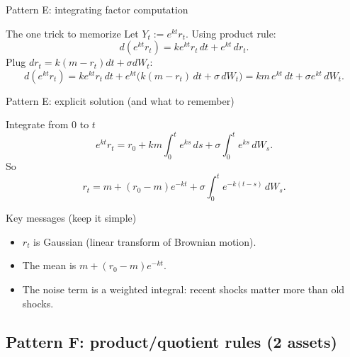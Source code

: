 \documentclass[10pt,aspectratio=169]{beamer}
\begin{document}
\begin{frame}{Pattern E: integrating factor computation}

\begin{block}{The one trick to memorize}
Let $Y_t:=e^{kt}r_t$. Using product rule:\pause
\[
d(e^{kt}r_t)=ke^{kt}r_t\,dt+e^{kt}\,dr_t.
\]
Plug $dr_t=k(m-r_t)dt+\sigma dW_t$:\pause
\[
d(e^{kt}r_t)
=
ke^{kt}r_t\,dt
+
e^{kt}\big(k(m-r_t)\,dt+\sigma\,dW_t\big)
=
km\,e^{kt}\,dt+\sigma e^{kt}\,dW_t.
\]
\end{block}

\end{frame}

\begin{frame}{Pattern E: explicit solution (and what to remember)}

\begin{block}{Integrate from $0$ to $t$}
\[
e^{kt}r_t
=
r_0 + km\int_0^t e^{ks}\,ds + \sigma\int_0^t e^{ks}\,dW_s.
\]
So
\[
r_t
=
m+(r_0-m)e^{-kt}
+\sigma\int_0^t e^{-k(t-s)}\,dW_s.
\]
\end{block}\pause

\begin{alertblock}{Key messages (keep it simple)}
\begin{itemize}
  \item $r_t$ is Gaussian (linear transform of Brownian motion).\pause
  \item The mean is $m+(r_0-m)e^{-kt}$.\pause
  \item The noise term is a weighted integral: recent shocks matter more than old shocks.\pause
\end{itemize}
\end{alertblock}

\end{frame}

\subsection{Pattern F: product/quotient rules (2 assets)}
\end{document}
